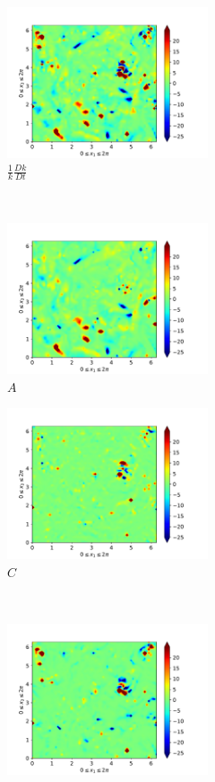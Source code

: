 \begin{figure}[H]
    \begin{subfigure}[H]{0.45\textwidth}
        \includegraphics[height=1.75in]{media/run-cds-65/ke-1400}
        \caption{$\frac{1}{k} \frac{D k}{Dt}$}
    \end{subfigure}
    ~
    \begin{subfigure}{0.45\textwidth}
        \includegraphics[height=1.75in]{media/run-cds-65/A-ke-1400}
        \caption{$A$}
    \end{subfigure}
    \newline
    \begin{subfigure}{0.45\textwidth}
        \includegraphics[height=1.75in]{media/run-cds-65/C-ke-1400}
        \caption{$C$}
    \end{subfigure}
    ~
    \begin{subfigure}{0.45\textwidth}
        \includegraphics[height=1.75in]{media/run-cds-65/P-ke-1400}

\end{subfigure}
\end{figure}
